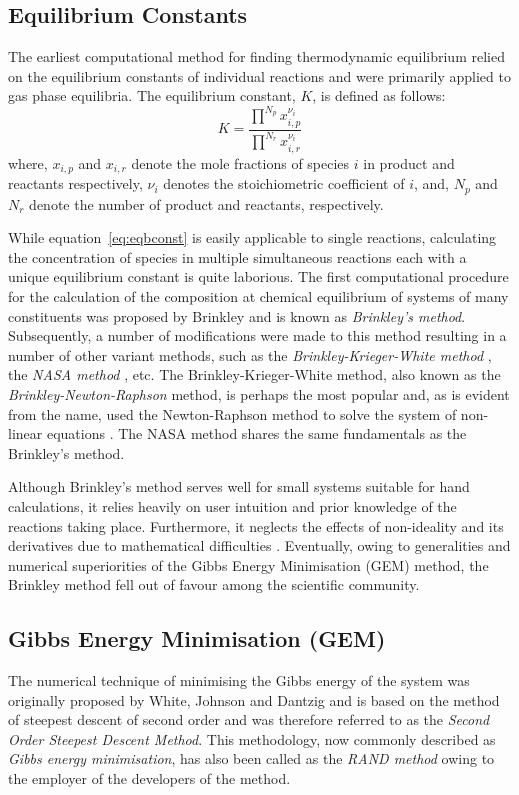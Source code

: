 	\subsection{Equilibrium Constants}
	The earliest computational method for finding thermodynamic equilibrium relied on the equilibrium constants of individual reactions and were primarily applied to gas phase equilibria. The equilibrium constant, $K$, is defined as follows:
	\begin{equation}\label{eq:eqbconst}
		K = \frac{\prod^{N_p} x_{i,p}^{\nu_i}}{\prod^{N_r} x_{i,r}^{\nu_i}}
	\end{equation}
	where, $x_{i,p}$ and $x_{i,r}$ denote the mole fractions of species $i$ in product and reactants respectively, $\nu_i$ denotes the stoichiometric coefficient of $i$, and, $N_p$ and $N_r$ denote the number of product and reactants, respectively.

	While equation~\eqref{eq:eqbconst} is easily applicable to single reactions, calculating the concentration of species in multiple simultaneous reactions each with a unique equilibrium constant is quite laborious. The first computational procedure for the calculation of the composition at chemical equilibrium of systems of many constituents was proposed by Brinkley \cite{Brinkley:1947aa} and is known as \emph{Brinkley's method}. Subsequently, a number of modifications were made to this method resulting in a number of other variant methods, such as the \emph{Brinkley-Krieger-White method} \cite{Krieger:1948aa}, the \emph{NASA method} \cite{Zeleznik:1968aa}, etc. The Brinkley-Krieger-White method, also known as the \emph{Brinkley-Newton-Raphson} method, is perhaps the most popular and, as is evident from the name, used the Newton-Raphson method to solve the system of non-linear equations \cite{vanZeggeren11}. The NASA method \cite{Zeleznik:1968aa} shares the same fundamentals as the Brinkley's method.

	Although Brinkley's method serves well for small systems suitable for hand calculations, it relies heavily on user intuition and prior knowledge of the reactions taking place. Furthermore, it neglects the effects of non-ideality and its derivatives due to mathematical difficulties \cite{Zeleznik:1968aa}. Eventually, owing to generalities and numerical superiorities of the Gibbs Energy Minimisation (GEM) method, the Brinkley method fell out of favour among the scientific community.

	\subsection{Gibbs Energy Minimisation (GEM)}
	The numerical technique of minimising the Gibbs energy of the system was originally proposed by White, Johnson and Dantzig \cite{White:58} and is based on the method of steepest descent of second order and was therefore referred to as the \emph{Second Order Steepest Descent Method}. This methodology, now commonly described as \emph{Gibbs energy minimisation}, has also been called as the \emph{RAND method} owing to the employer of the developers of the method.

